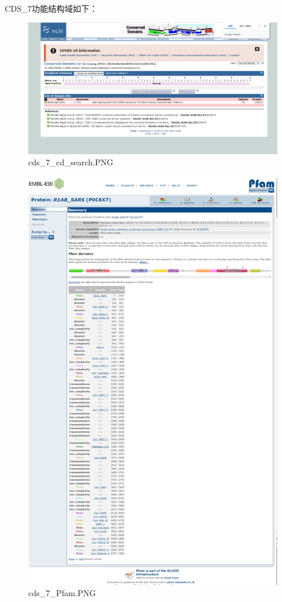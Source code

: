 \documentclass[supercite]{HustGraduPaper}
\begin{document}
	\paragraph{}\label{subpara:subpara}CDS\_7功能结构域如下：
	\begin{figure}[H]
		\centering
		\includegraphics[width=1\textwidth]{./material/practice2/cds_7/cd_search.png}
		\caption{cds\_7\_cd\_search.PNG}
	\end{figure}
	\begin{figure}[H]
		\centering
		\includegraphics[width=1\textwidth]{./material/practice2/cds_7/Pfam.png}
		\caption{cds\_7\_Pfam.PNG}
	\end{figure}
\end{document}
